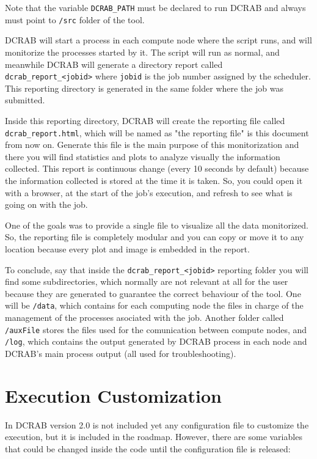 \documentclass[10pt,a4paper]{report}
\begin{document}
Note that the variable \verb+DCRAB_PATH+ must be declared to run DCRAB and always must point to \verb+/src+ folder of the tool.

DCRAB will start a process in each compute node where the script runs, and will monitorize the processes started by it. The script will run as normal, and meanwhile DCRAB will generate a directory report called \verb+dcrab_report_<jobid>+ where \verb+jobid+ is the job number assigned by the scheduler. This reporting directory is generated in the same folder where the job was submitted.

\sloppy Inside this reporting directory, DCRAB will create the reporting file called \verb+dcrab_report.html+, which will be named as "the reporting file" is this document from now on. Generate this file is the main purpose of this monitorization and there you will find statistics and plots to analyze visually the information collected. This report is continuous change (every 10 seconds by default) because the information collected is stored at the time it is taken. So, you could open it with a browser, at the start of the job's execution, and refresh to see what is going on with the job.

One of the goals was to provide a single file to visualize all the data monitorized. So, the reporting file is completely modular and you can copy or move it to any location because every plot and image is embedded in the report.

To conclude, say that inside the \verb+dcrab_report_<jobid>+ reporting folder you will find some subdirectories, which normally are not relevant at all for the user because they are generated to guarantee the correct behaviour of the tool. One will be \verb+/data+, which contains for each computing node the files in charge of the management of the processes asociated with the job. Another folder called \verb+/auxFile+ stores the files used for the comunication between compute nodes, and \verb+/log+, which contains the output generated by DCRAB process in each node and DCRAB's main process output (all used for troubleshooting).

\section{Execution Customization}

In DCRAB version 2.0 is not included yet any configuration file to customize the execution, but it is included in the roadmap. However, there are some variables that could be changed inside the code until the configuration file is released:
\end{document}
